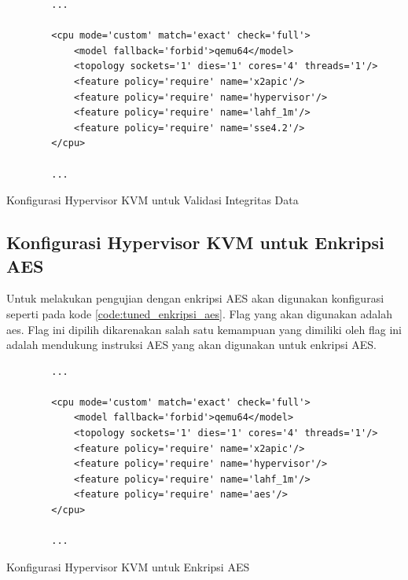 \begin{listing}[H]
    \begin{verbatim}
        ...

        <cpu mode='custom' match='exact' check='full'>
            <model fallback='forbid'>qemu64</model>
            <topology sockets='1' dies='1' cores='4' threads='1'/>
            <feature policy='require' name='x2apic'/>
            <feature policy='require' name='hypervisor'/> 
            <feature policy='require' name='lahf_1m'/>
            <feature policy='require' name='sse4.2'/>
        </cpu>
        
        ...
    \end{verbatim}
    \caption{Konfigurasi Hypervisor KVM untuk Validasi Integritas Data}
    \label{code:tuned_validasi_integritas_file}
\end{listing}

\subsection{Konfigurasi Hypervisor KVM untuk Enkripsi AES}
Untuk melakukan pengujian dengan enkripsi AES akan digunakan konfigurasi seperti pada kode \ref{code:tuned_enkripsi_aes}. Flag yang akan digunakan adalah aes. Flag ini dipilih dikarenakan salah satu kemampuan yang dimiliki oleh flag ini adalah mendukung instruksi AES yang akan digunakan untuk enkripsi AES.

\begin{listing}[H]
    \begin{verbatim}
        ...

        <cpu mode='custom' match='exact' check='full'>
            <model fallback='forbid'>qemu64</model>
            <topology sockets='1' dies='1' cores='4' threads='1'/>
            <feature policy='require' name='x2apic'/>
            <feature policy='require' name='hypervisor'/> 
            <feature policy='require' name='lahf_1m'/>
            <feature policy='require' name='aes'/>
        </cpu>
        
        ...
    \end{verbatim}
    \caption{Konfigurasi Hypervisor KVM untuk Enkripsi AES}
    \label{code:tuned_enkripsi_aes}
\end{listing}

